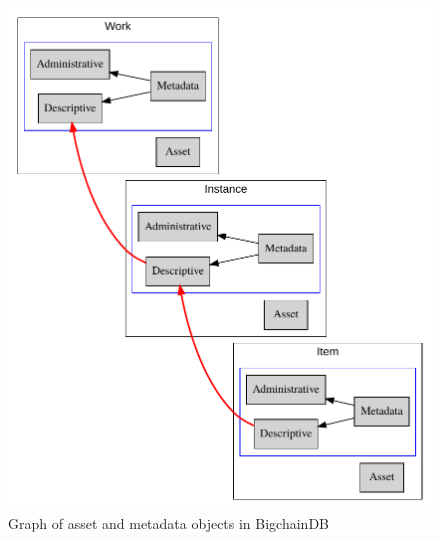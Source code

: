 \begin{figure}[!htb]
	\centering\includegraphics[width=\columnwidth]{images/assets-metadata.pdf}  
	\caption{Graph of asset and metadata objects in BigchainDB}\label{f:rbac}
\end{figure}

